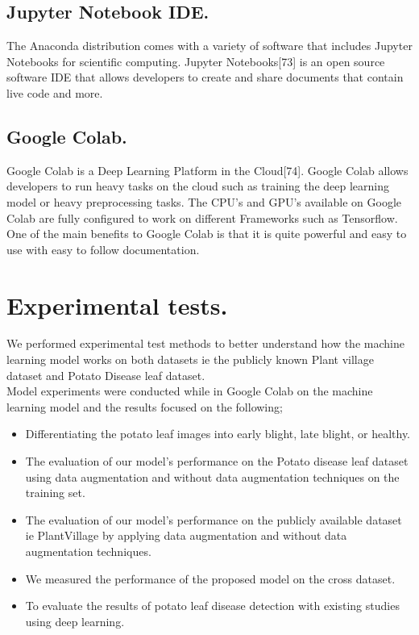 \documentclass[11pt]{report}
\begin{document}
\subsection{Jupyter Notebook IDE.}
The Anaconda distribution comes with a variety of software that includes Jupyter Notebooks for scientific
computing. Jupyter Notebooks[73] is an open source software IDE that allows developers to create and share
documents that contain live code and more.\\

\subsection{Google Colab.}
Google Colab is a Deep Learning Platform in the Cloud[74]. Google Colab allows developers to run heavy tasks on
the cloud such as training the deep learning model or heavy preprocessing tasks. The CPU’s and GPU’s
available on Google Colab are fully configured to work on different Frameworks such as Tensorflow. One of the
main benefits to Google Colab is that it is quite powerful and easy to use with easy to follow documentation.\\


\section{Experimental tests.}
We performed experimental test methods to better understand how the machine learning model works on both datasets ie the publicly known Plant village dataset and Potato Disease leaf dataset.\\

Model experiments were conducted while in Google Colab on the machine learning model and the results focused on the following;
\begin{itemize}
	\item Differentiating the potato leaf images into early blight, late blight, or healthy.\\
	\item The evaluation of our model’s performance on the Potato disease leaf dataset using data augmentation and without data augmentation techniques on the training set.\\
	\item The evaluation of our model’s performance on the publicly
	available dataset ie PlantVillage by applying data augmentation and without data augmentation techniques.
	\item We measured the performance of the proposed model on the cross dataset.\\
	\item To evaluate the results of potato leaf disease detection with existing studies using
	deep learning.\\
\end{itemize}
\end{document}
